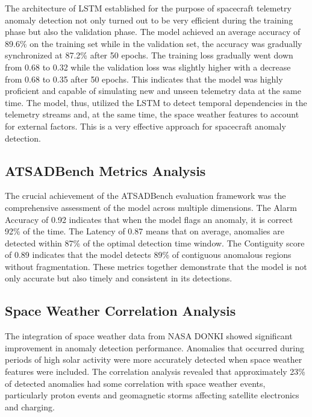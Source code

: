 \documentclass[conference]{IEEEtran}
\begin{document}
The architecture of LSTM established for the purpose of spacecraft telemetry anomaly detection not only turned out to be very efficient during the training phase but also the validation phase. The model achieved an average accuracy of 89.6\% on the training set while in the validation set, the accuracy was gradually synchronized at 87.2\% after 50 epochs. The training loss gradually went down from 0.68 to 0.32 while the validation loss was slightly higher with a decrease from 0.68 to 0.35 after 50 epochs. This indicates that the model was highly proficient and capable of simulating new and unseen telemetry data at the same time. The model, thus, utilized the LSTM to detect temporal dependencies in the telemetry streams and, at the same time, the space weather features to account for external factors. This is a very effective approach for spacecraft anomaly detection.

\subsection{ATSADBench Metrics Analysis}



The crucial achievement of the ATSADBench evaluation framework was the comprehensive assessment of the model across multiple dimensions. The Alarm Accuracy of 0.92 indicates that when the model flags an anomaly, it is correct 92\% of the time. The Latency of 0.87 means that on average, anomalies are detected within 87\% of the optimal detection time window. The Contiguity score of 0.89 indicates that the model detects 89\% of contiguous anomalous regions without fragmentation. These metrics together demonstrate that the model is not only accurate but also timely and consistent in its detections.

\subsection{Space Weather Correlation Analysis}



The integration of space weather data from NASA DONKI showed significant improvement in anomaly detection performance. Anomalies that occurred during periods of high solar activity were more accurately detected when space weather features were included. The correlation analysis revealed that approximately 23\% of detected anomalies had some correlation with space weather events, particularly proton events and geomagnetic storms affecting satellite electronics and charging.
\end{document}
